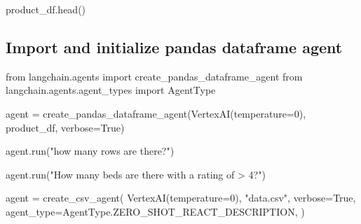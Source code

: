 \documentclass[
  letterpaper,
  DIV=11,
  numbers=noendperiod]{scrreprt}
\newenvironment{Shaded}{\begin{snugshade}}{\end{snugshade}}
\newcommand{\DecValTok}[1]{\textcolor[rgb]{0.68,0.00,0.00}{#1}}
\newcommand{\ImportTok}[1]{\textcolor[rgb]{0.00,0.46,0.62}{#1}}
\newcommand{\NormalTok}[1]{\textcolor[rgb]{0.00,0.23,0.31}{#1}}
\newcommand{\OperatorTok}[1]{\textcolor[rgb]{0.37,0.37,0.37}{#1}}
\newcommand{\StringTok}[1]{\textcolor[rgb]{0.13,0.47,0.30}{#1}}
\newcommand{\VariableTok}[1]{\textcolor[rgb]{0.07,0.07,0.07}{#1}}
\begin{document}
\begin{Shaded}
\begin{Highlighting}[]
\NormalTok{product\_df.head()}
\end{Highlighting}
\end{Shaded}

\hypertarget{import-and-initialize-pandas-dataframe-agent}{%
\subsection{Import and initialize pandas dataframe
agent}\label{import-and-initialize-pandas-dataframe-agent}}

\begin{Shaded}
\begin{Highlighting}[]
\ImportTok{from}\NormalTok{ langchain.agents }\ImportTok{import}\NormalTok{ create\_pandas\_dataframe\_agent}
\ImportTok{from}\NormalTok{ langchain.agents.agent\_types }\ImportTok{import}\NormalTok{ AgentType}
\end{Highlighting}
\end{Shaded}

\begin{Shaded}
\begin{Highlighting}[]
\NormalTok{agent }\OperatorTok{=}\NormalTok{ create\_pandas\_dataframe\_agent(VertexAI(temperature}\OperatorTok{=}\DecValTok{0}\NormalTok{), product\_df, verbose}\OperatorTok{=}\VariableTok{True}\NormalTok{)}
\end{Highlighting}
\end{Shaded}

\begin{Shaded}
\begin{Highlighting}[]
\NormalTok{agent.run(}\StringTok{"how many rows are there?"}\NormalTok{)}
\end{Highlighting}
\end{Shaded}

\begin{Shaded}
\begin{Highlighting}[]
\NormalTok{agent.run(}\StringTok{"How many beds are there with a rating of \textgreater{} 4?"}\NormalTok{)}
\end{Highlighting}
\end{Shaded}

\begin{Shaded}
\begin{Highlighting}[]
\NormalTok{agent }\OperatorTok{=}\NormalTok{ create\_csv\_agent(}
\NormalTok{    VertexAI(temperature}\OperatorTok{=}\DecValTok{0}\NormalTok{),}
    \StringTok{"data.csv"}\NormalTok{,}
\NormalTok{    verbose}\OperatorTok{=}\VariableTok{True}\NormalTok{,}
\NormalTok{    agent\_type}\OperatorTok{=}\NormalTok{AgentType.ZERO\_SHOT\_REACT\_DESCRIPTION,}
\NormalTok{)}
\end{Highlighting}
\end{Shaded}
\end{document}
